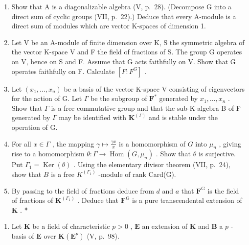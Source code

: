 \begin{enumerate}
\def\labelenumi{\alph{enumi})}
\item
  Show that A is a diagonalizable algebra (V, p.~28). (Decompose G into a direct sum of cyclic groups (VII, p.~22).) Deduce that every A-module is a direct sum of modules which are vector K-spaces of dimension 1.
\item
  Let V be an A-module of finite dimension over K, S the symmetric algebra of the vector K-space V and F the field of fractions of S. The group G operates on V, hence on S and F. Assume that G acts faithfully on V. Show that G operates faithfully on F. Calculate \([F : F^{G}]\) .
\item
  Let \((x_{1},\ldots ,x_{n})\) be a basis of the vector K-space V consisting of eigenvectors for the action of G. Let \(\Gamma\) be the subgroup of \(\mathbf{F}^*\) generated by \(x_{1},\ldots ,x_{n}\) . Show that \(\Gamma\) is a free commutative group and that the sub-K-algebra B of F generated by \(\Gamma\) may be identified with \(\mathbf{K}^{(\Gamma)}\) and is stable under the operation of G.
\item
  For all \(x \in \Gamma\) , the mapping \(\gamma \mapsto \frac{\gamma x}{x}\) is a homomorphism of \(G\) into \(\mu_n\) , giving rise to a homomorphism \(\theta: \Gamma \to \operatorname{Hom}(G, \mu_n)\) . Show that \(\theta\) is surjective. Put \(\Gamma_1 = \operatorname{Ker}(\theta)\) . Using the elementary divisor theorem (VII, p.~24), show that \(B\) is a free \(K^{(\Gamma_1)}\) -module of rank Card(G).
\item
  By passing to the field of fractions deduce from \(d\) and \(a\) that \(\mathbf{F}^{\mathrm{G}}\) is the field of fractions of \(\mathbf{K}^{(\Gamma_1)}\) . Deduce that \(\mathbf{F}^{\mathrm{G}}\) is a pure transcendental extension of \(\mathbf{K}\) . *
\end{enumerate}

\BourbakiExerciseGroup

\begin{enumerate}
\def\labelenumi{\arabic{enumi})}
\tightlist
\item
  Let \(\mathbf{K}\) be a field of characteristic \(p > 0\) , \(\mathbf{E}\) an extension of \(\mathbf{K}\) and \(\mathbf{B}\) a \(p\) -basis of \(\mathbf{E}\) over \(\mathbf{K}(\mathbf{E}^p)\) (V, p.~98).
\end{enumerate}

